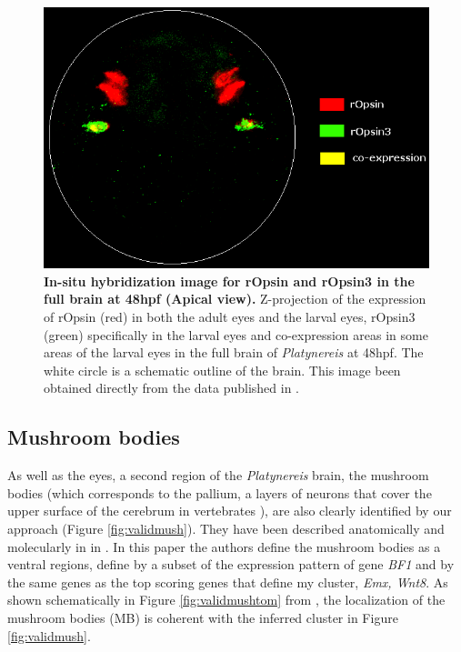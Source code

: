	
	\begin{figure}[H]
\centerline{\includegraphics[width=1\linewidth]{gfx/chapter6/insitu.png}}
\caption{{\bf In-situ hybridization image for rOpsin and rOpsin3 in the full brain at 48hpf (Apical view).} Z-projection of the expression of rOpsin (red) in both the adult eyes and the larval eyes, rOpsin3 (green) specifically in the larval eyes and co-expression areas in some areas of the larval eyes in the full brain of {\it{Platynereis}} at 48hpf. The white circle is a schematic outline of the brain.  This image been obtained directly from the data published in \citep{Tomer10}.}
\label{fig:valideyesinsitu}
	\end{figure}
	
	
		\subsection{Mushroom bodies}
		As well as the eyes, a second region of the {\it{Platynereis}} brain, the mushroom bodies (which corresponds to the pallium, a layers of neurons that cover the upper surface of the cerebrum in vertebrates \citep{Tomer10}), are also clearly identified by our approach (Figure \ref{fig:validmush}). They have been described anatomically and molecularly in \platy{} in \citep{Tomer10}. In this paper the authors define the mushroom bodies as a ventral regions, define by a subset of the expression pattern of gene \emph{BF1} and by the same genes as the top scoring genes that define my cluster, \emph{Emx, Wnt8}. As shown schematically in Figure \ref{fig:validmushtom} from \citep{Tomer10}, the localization of the mushroom bodies (MB) is coherent with the inferred cluster in Figure \ref{fig:validmush}.
		
